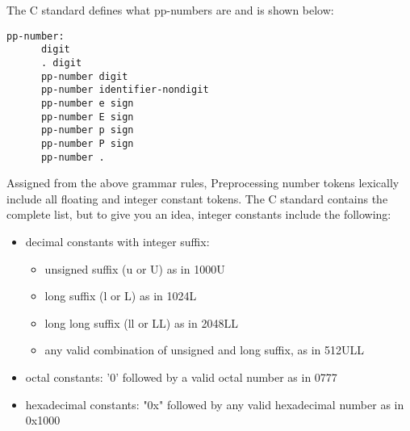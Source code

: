 %
% 



The C standard defines what pp-numbers are and is shown below:

\begin{verbatim}
pp-number:
      digit
      . digit
      pp-number digit
      pp-number identifier-nondigit
      pp-number e sign
      pp-number E sign
      pp-number p sign
      pp-number P sign
      pp-number .
\end{verbatim}

Assigned from the above grammar rules, Preprocessing number tokens lexically include all floating and integer constant tokens. The C standard contains the complete list, but to give you an idea, integer constants include the following:

\begin{itemize}
\item decimal constants with integer suffix:
        \begin{itemize}
        \item unsigned suffix (u or U) as in 1000U
        \item long suffix (l or L) as in 1024L
        \item long long suffix (ll or LL) as in 2048LL
        \item any valid combination of unsigned and long suffix, as in 512ULL
        \end{itemize}

\item octal constants: '0' followed by a valid octal number as in 0777

\item hexadecimal constants: "0x" followed by any valid hexadecimal number as in 0x1000
\end{itemize}

